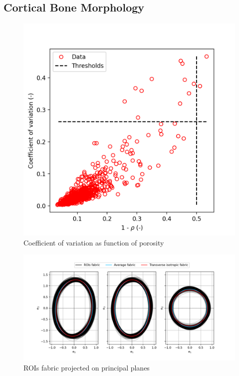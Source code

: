 \documentclass[a4paper,fleqn]{DC_ArtStyle}
\begin{document}
	\subsection{Cortical Bone Morphology}
	\begin{figure}
		\centering
			\includegraphics[width=\linewidth]{../Results/CV_Rho}
			\caption{Coefficient of variation as function of porosity}
	\end{figure}
	\begin{figure}
		\centering
		\includegraphics[width=\linewidth]{../Results/Fabric/Fabric}
		\caption{ROIs fabric projected on principal planes}
	\end{figure}
	
	\clearpage
\end{document}
